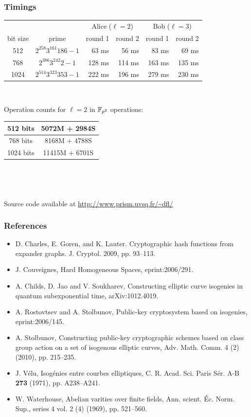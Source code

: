 \documentclass{beamer}
\begin{document}
\begin{frame}
\frametitle{Timings}
{\small
  \begin{tabular}{c | c | r | r | r | r}
     & & \multicolumn{2}{c|}{Alice ($\ell=2$)} & \multicolumn{2}{|c}{Bob ($\ell=3$)}\\
    bit size & prime & round 1 & round 2 & round 1 & round 2\\
    \hline
    512 & $2^{258}3^{161}186-1$ &  63 ms &  56 ms &  83 ms &  69 ms \\
    \hline
    768 & $2^{386}3^{242}2-1$ & 128 ms & 114 ms &  163 ms &  135 ms \\
    \hline
    1024 & $2^{514}3^{323}353-1$ & 222 ms & 196 ms & 279 ms & 230 ms\\
  \end{tabular}
}

\ 

Operation counts for $\ell=2$ in $\mathbb{F}_{p^2}$ operations:
\begin{center}
\begin{tabular}{|c|c|} \hline
512 bits & 5072M + 2984S \\ \hline
768 bits & 8168M + 4788S \\ \hline
1024 bits & 11415M + 6701S \\ \hline
\end{tabular}
\end{center}

\ 

\ 

Source code available at \url{http://www.prism.uvsq.fr/~dfl/}
\end{frame}

\begin{frame}
\frametitle{References}
\small
\begin{itemize}
\item D. Charles, E. Goren, and K. Lauter. Cryptographic hash functions
from expander graphs. J. Cryptol. 2009, pp. 93--113.
\item J. Couveignes, Hard Homogeneous Spaces, eprint:2006/291.
\item A. Childs, D. Jao and V. Soukharev, Constructing elliptic curve
  isogenies in quantum subexponential time, arXiv:1012.4019.
\item A. Rostovtsev and A. Stolbunov, Public-key cryptosystem based on
  isogenies, eprint:2006/145.
\item A. Stolbunov, Constructing public-key cryptographic schemes
  based on class group action on a set of isogenous elliptic curves,
  Adv. Math. Comm. 4 (2) (2010), pp. 215--235.
\item J. V\'elu, Isog\'enies entre courbes elliptiques,
  C. R. Acad. Sci. Paris S\'er. A-B \textbf{273} (1971),
  pp. A238--A241.
\item W. Waterhouse, Abelian varities over finite fields,
  Ann. scient. \'Ec. Norm. Sup., series 4 vol. 2 (4) (1969),
  pp. 521--560.
\end{itemize}
\end{frame}
\end{document}
